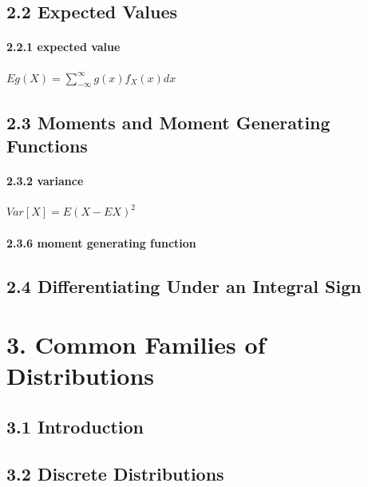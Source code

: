 \documentclass[6pt,Portrait]{article}
\let\oldparagraph\paragraph
\renewcommand{\paragraph}[1]{\oldparagraph{#1}\mbox{}}
\begin{document}
\hypertarget{expected-values}{%
\subsection{2.2 Expected Values}\label{expected-values}}

\hypertarget{mean}{%
\paragraph{2.2.1 expected value}\label{mean}}

\(Eg(X)=\sum_{-\infty}^\infty g(x)f_X(x)dx\)

\hypertarget{moments-and-moment-generating-functions}{%
\subsection{2.3 Moments and Moment Generating
Functions}\label{moments-and-moment-generating-functions}}

\hypertarget{Var}{%
\paragraph{2.3.2 variance}\label{Var}}

\(Var[X]=E(X-EX)^2\)

\hypertarget{MGF}{%
\paragraph{2.3.6 moment generating function}\label{MGF}}

\hypertarget{differentiating-under-an-integral-sign}{%
\subsection{2.4 Differentiating Under an Integral
Sign}\label{differentiating-under-an-integral-sign}}

\hypertarget{common-families-of-distributions}{%
\section{3. Common Families of
Distributions}\label{common-families-of-distributions}}

\hypertarget{introduction}{%
\subsection{3.1 Introduction}\label{introduction}}

\hypertarget{discrete-distributions}{%
\subsection{3.2 Discrete Distributions}\label{discrete-distributions}}
\end{document}
